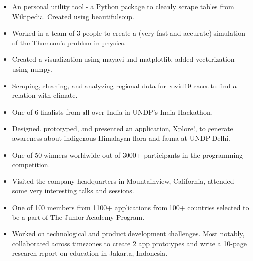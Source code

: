 \documentclass[a4paper]{resume}
\begin{document}
\begin{itemize} \vspace{-5pt} \itemsep -2pt
	\item An personal utility tool - a Python package to cleanly scrape tables from Wikipedia. Created using beautifulsoup.
\end{itemize}
\enresubsection
{}
\begin{itemize} \vspace{-5pt} \itemsep -2pt
	\item Worked in a team of 3 people to create a (very fast and accurate) simulation of the Thomson's problem in physics.
	\item Created a visualization using mayavi and matplotlib, added vectorization using numpy.
\end{itemize}
\enresubsection
{}
\begin{itemize} \vspace{-5pt} \itemsep -2pt
	\item Scraping, cleaning, and analyzing regional data for covid19 cases to find a relation with climate.
\end{itemize}
\enresection

\begin{itemize} \vspace{-5pt} \itemsep -2pt
	\item One of 6 finalists from all over India in UNDP's India Hackathon.
	\item Designed, prototyped, and presented an application, Xplore!, to generate awareness about indigenous Himalayan flora and fauna at UNDP Delhi.
\end{itemize}
\enresubsection
{}
\begin{itemize} \vspace{-5pt} \itemsep -2pt
	\item One of 50 winners worldwide out of 3000+ participants in the programming competition. 
	\item Visited the company headquarters in Mountainview, California, attended some very interesting talks and sessions.
\end{itemize}
\enresubsection
{}
\begin{itemize} \vspace{-5pt} \itemsep -2pt
	\item One of 100 members from 1100+ applications from 100+ countries selected to be a part
of The Junior Academy Program.
	\item Worked on technological and product development challenges. Most notably, collaborated across timezones to create 2 app prototypes and write a 10-page research report on education in Jakarta, Indonesia.
\end{itemize}
\enresection
\end{document}
